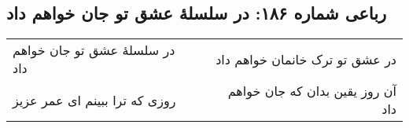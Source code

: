 \begin{center}
\section*{رباعی شماره ۱۸۶: در سلسلهٔ عشق تو جان خواهم داد}
\label{sec:sh186}
\begin{longtable}{l p{0.5cm} r}
در سلسلهٔ عشق تو جان خواهم داد
&&
در عشق تو ترک خانمان خواهم داد
\\
روزی که ترا ببینم ای عمر عزیز
&&
آن روز یقین بدان که جان خواهم داد
\\
\end{longtable}
\end{center}
